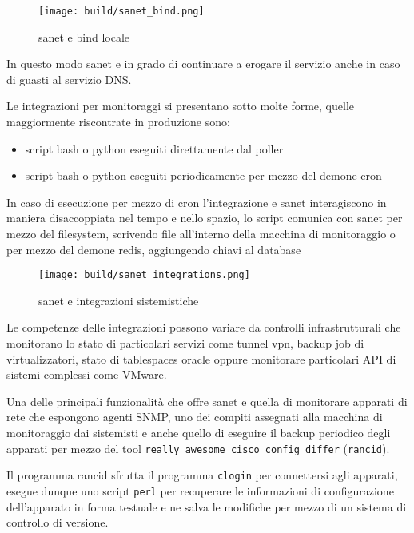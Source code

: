 \begin{figure}[H]
    \centering
    \texttt{[image: build/sanet\_bind.png]}
    \caption{sanet e bind locale}
    \label{fig:enter-label}
\end{figure}

In questo modo sanet e in grado di continuare a erogare il servizio anche in caso di guasti al servizio DNS.

Le integrazioni per monitoraggi si presentano sotto molte forme, quelle maggiormente riscontrate in produzione sono:

\begin{itemize}
  \item{script bash o python eseguiti direttamente dal poller}
  \item{script bash o python eseguiti periodicamente per mezzo del demone cron}
\end{itemize}

In caso di esecuzione per mezzo di cron l'integrazione e sanet interagiscono in maniera disaccoppiata nel tempo e nello spazio, lo script comunica con sanet per mezzo del filesystem, scrivendo file all'interno della macchina di monitoraggio o per mezzo del demone redis, aggiungendo chiavi al database

\begin{figure}[H]
    \centering
    \texttt{[image: build/sanet\_integrations.png]}
    \caption{sanet e integrazioni sistemistiche}
    \label{fig:enter-label}
\end{figure}

Le competenze delle integrazioni possono variare da controlli infrastrutturali che monitorano lo stato di particolari servizi come tunnel vpn, backup job di virtualizzatori, stato di tablespaces oracle oppure monitorare particolari API di sistemi complessi come VMware.

Una delle principali funzionalità che offre sanet e quella di monitorare apparati di rete che espongono agenti SNMP, uno dei compiti assegnati alla macchina di monitoraggio dai sistemisti e anche quello di eseguire il backup periodico degli apparati per mezzo del tool \verb|really awesome cisco config differ| (\verb|rancid|).

Il programma rancid sfrutta il programma \verb|clogin| per connettersi agli apparati, esegue dunque uno script \verb|perl| per recuperare le informazioni di configurazione dell'apparato in forma testuale e ne salva le modifiche per mezzo di un sistema di controllo di versione.

